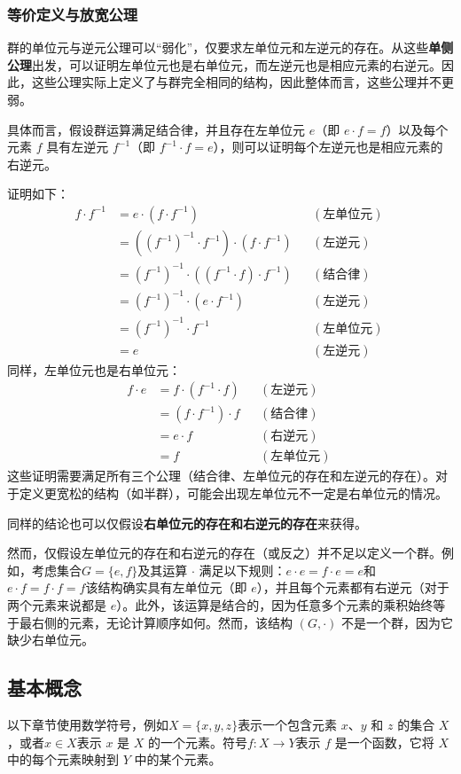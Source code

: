 \subsubsection{等价定义与放宽公理} 
群的单位元与逆元公理可以“弱化”，仅要求左单位元和左逆元的存在。从这些\textbf{单侧公理}出发，可以证明左单位元也是右单位元，而左逆元也是相应元素的右逆元。因此，这些公理实际上定义了与群完全相同的结构，因此整体而言，这些公理并不更弱。  

具体而言，假设群运算满足结合律，并且存在左单位元 \( e \)（即 \( e \cdot f = f \)）以及每个元素 \( f \) 具有左逆元 \( f^{-1} \)（即 \( f^{-1} \cdot f = e \)），则可以证明每个左逆元也是相应元素的右逆元。  

证明如下：  
\[
\begin{aligned}
f \cdot f^{-1} &= e \cdot (f \cdot f^{-1}) && (\text{左单位元}) \\
&= ((f^{-1})^{-1} \cdot f^{-1}) \cdot (f \cdot f^{-1}) && (\text{左逆元}) \\
&= (f^{-1})^{-1} \cdot ((f^{-1} \cdot f) \cdot f^{-1}) && (\text{结合律}) \\
&= (f^{-1})^{-1} \cdot (e \cdot f^{-1}) && (\text{左逆元}) \\
&= (f^{-1})^{-1} \cdot f^{-1} && (\text{左单位元}) \\
&= e && (\text{左逆元})
\end{aligned}~
\]
同样，左单位元也是右单位元： 
\[
\begin{aligned}
f \cdot e &= f \cdot (f^{-1} \cdot f) && (\text{左逆元}) \\
&= (f \cdot f^{-1}) \cdot f && (\text{结合律}) \\
&= e \cdot f && (\text{右逆元}) \\
&= f && (\text{左单位元})
\end{aligned}~
\]
这些证明需要满足所有三个公理（结合律、左单位元的存在和左逆元的存在）。对于定义更宽松的结构（如半群），可能会出现左单位元不一定是右单位元的情况。  

同样的结论也可以仅假设\textbf{右单位元的存在和右逆元的存在}来获得。

然而，仅假设左单位元的存在和右逆元的存在（或反之）并不足以定义一个群。例如，考虑集合\(G = \{ e, f \}\)及其运算 \( \cdot \) 满足以下规则：\(e \cdot e = f \cdot e = e\)和\(e \cdot f = f \cdot f = f\)该结构确实具有左单位元（即 \( e \)），并且每个元素都有右逆元（对于两个元素来说都是 \( e \)）。此外，该运算是结合的，因为任意多个元素的乘积始终等于最右侧的元素，无论计算顺序如何。然而，该结构 \((G, \cdot)\) 不是一个群，因为它缺少右单位元。
\subsection{基本概念}  
以下章节使用数学符号，例如\(X = \{x, y, z\}\)表示一个包含元素 \( x \)、\( y \) 和 \( z \) 的集合 \( X \)，或者\(x \in X\)表示 \( x \) 是 \( X \) 的一个元素。符号\(f: X \to Y\)表示 \( f \) 是一个函数，它将 \( X \) 中的每个元素映射到 \( Y \) 中的某个元素。  

